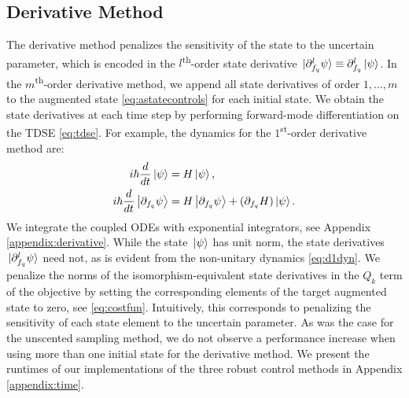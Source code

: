 \documentclass[
  amsfonts,
  amsmath,
  amssymb,
  pra,
  twocolumn,
  superscriptaddress,
]{revtex4-2}
\begin{document}
\subsection{Derivative Method}
The derivative method penalizes the sensitivity of the state
to the uncertain parameter, which is encoded in the $l$\textsuperscript{th}-order
state derivative $\ket*{\partial_{f_{q}}^{l} \psi} \equiv \partial_{f_{q}}^{l} \ket*{\psi}$.
In the $m$\textsuperscript{th}-order
derivative method, we append all state derivatives of order $1, \dots, m$
to the augmented state \eqref{eq:astatecontrols}
for each initial state.
We obtain the state derivatives at each time step by performing forward-mode
differentiation on the TDSE \eqref{eq:tdse}.
For example, the dynamics for the $1$\textsuperscript{st}-order derivative method are:
\begin{align}
  i \hbar \frac{d}{dt} \ket{\psi} &= H \ket{\psi},\\
  i \hbar \frac{d}{dt} \ket{\partial_{f_{q}}\psi} &=
  H \ket{\partial_{f_{q}} \psi} +
  (\partial_{f_{q}} H) \ket{\psi}.
  \label{eq:d1dyn}
\end{align}
We integrate the coupled ODEs with exponential
integrators, see Appendix \ref{appendix:derivative}.
While the state $\ket*{\psi}$ has unit norm,
the state derivatives $\ket*{\partial^{l}_{f_{q}} \psi}$ need not, as is evident
from the non-unitary dynamics \eqref{eq:d1dyn}.
We penalize the norms of the isomorphism-equivalent state derivatives
in the $Q_{k}$ term of the objective by setting the corresponding elements
of the target augmented state to zero, see \eqref{eq:costfun}. Intuitively, this corresponds to penalizing
the sensitivity of each state element to the uncertain parameter. As was the case for
the unscented sampling
method, we do not observe a performance increase when using more than one initial state
for the derivative method.
We present the runtimes of our implementations of the three robust control methods
in Appendix \ref{appendix:time}.
\end{document}
